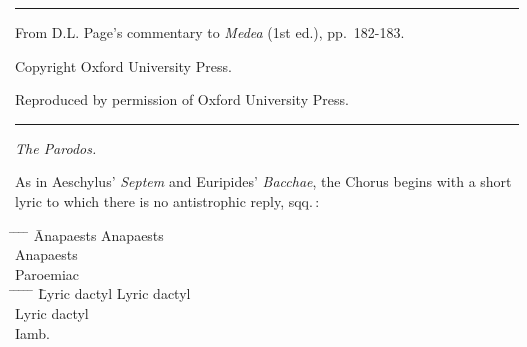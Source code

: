 \documentclass[11pt]{report}
\renewcommand{\(}{\begin{metrike}}
\renewcommand{\)}{\end{metrike}}
\begin{document}
%
\hrule height 1.5pt \vspace{1ex}
{\large From D.L. Page's commentary to \textit{Medea} (1st ed.), pp.~182-183.}\par 
\vspace{1ex}
Copyright Oxford University Press.\par
Reproduced by permission of Oxford University Press.\par 
\vspace{1ex} \hrule height 1.5pt
\vspace{5ex}
{\noindent\textit{The Parodos.}}\par
\vspace{1ex}
As in Aeschylus' \textit{Septem} and Euripides' \textit{Bacchae}, the
Chorus begins with a short lyric to which there is no antistrophic 
reply,  sqq.\,:\par
%
%
\begin{tabbing}
%
%
\hspace*{2em}\hspace{.25em}%
\=\metra{\b\b\m}\hspace{.25em}%
\=\metra{\m\m}\hspace{.25em}%
\=\metra{\b\b\m}\hspace{.25em}%
\=\metra{\b\bm}\hspace{2em}%
\=Anapaests\kill%
%
%
\>\metra{\b\b\m}%
\>\metra{\m\m}%
\>\metra{\b\b\m}%
\>\metra{\b\b\m}%
\>Anapaests\\%
%
\>\metra{\m\m}%
\>\metra{\m\m}%
\>\metra{\m\b\b}%
\>\metra{\m\b\b}%
\>Anapaests\\%
%
\>\metra{\m\b\b}%
\>\metra{\m\m}%
\>\metra{\m\m}%
\>\metra{\m}%
\>Paroemiac\\%
%
%
\hspace{.25em}%
\=\metra{\m\b\b}\hspace{.25em}%
\=\metra{\m\b\b}\hspace{.25em}%
\=\metra{\m\b\b}\hspace{.25em}%
\=\metra{\m\b\b}\hspace{.25em}%
\=\metra{\m\b\m}\hspace{2em}%
\=Lyric dactyl\kill%
%
\>\metra{\m\b\b}%
\>\metra{\m\b\b}%
\>\metra{\m\b\b}%
\>\metra{\m\b\b}%
\>\metra{\m\b\m}%
\>Lyric dactyl\\%
%
\>\metra{\m\b\b}%
\>\metra{\m\b\b}%
\>\metra{\m\b\b}%
\>\metra{\m\b\b}%
\>\metra{\m\b\m}%
\>Lyric dactyl\\%
%
\>%
\>\metra{\m\b\b}%
\>\metra{\b\m\c\m\b\m\c\b\m\m}%
\>%
\>%
\>Iamb.\\%
\end{tabbing}\par
\end{document}
